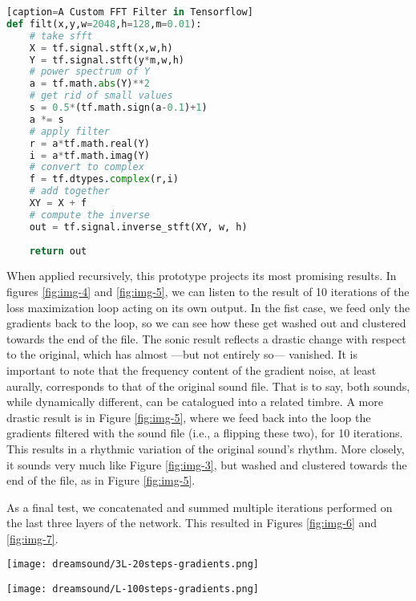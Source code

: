 \documentclass{nime-alternate}
\begin{document}
\begin{lstlisting}[language=Python][caption=A Custom FFT Filter in Tensorflow]
def filt(x,y,w=2048,h=128,m=0.01):
    # take sfft
    X = tf.signal.stft(x,w,h)
    Y = tf.signal.stft(y*m,w,h)
    # power spectrum of Y
    a = tf.math.abs(Y)**2
    # get rid of small values
    s = 0.5*(tf.math.sign(a-0.1)+1)
    a *= s 
    # apply filter
    r = a*tf.math.real(Y)
    i = a*tf.math.imag(Y)
    # convert to complex
    f = tf.dtypes.complex(r,i)
    # add together
    XY = X + f
    # compute the inverse
    out = tf.signal.inverse_stft(XY, w, h)
    
    return out
\end{lstlisting}
When applied recursively, this prototype projects its most promising results. In figures \ref{fig:img-4} and \ref{fig:img-5}, we can listen to the result of 10 iterations of the loss maximization loop acting on its own output. In the fist case, we feed only the gradients back to the loop, so we can see how these get washed out and clustered towards the end of the file. The sonic result reflects a drastic change with respect to the original, which has almost ---but not entirely so--- vanished. It is important to note that the frequency content of the gradient noise, at least aurally, corresponds to that of the original sound file. That is to say, both sounds, while dynamically different, can be catalogued into a related timbre. A more drastic result is in Figure \ref{fig:img-5}, where we feed back into the loop the gradients filtered with the sound file (i.e., a flipping these two), for 10 iterations. This results in a rhythmic variation of the original sound's rhythm. More closely, it sounds very much like Figure \ref{fig:img-3}, but washed and clustered towards the end of the file, as in Figure \ref{fig:img-5}. 

As a final test, we concatenated and summed multiple iterations performed on the last three layers of the network. This resulted in Figures  \ref{fig:img-6} and  \ref{fig:img-7}.

\begin{figure*}[htbp]
       \centering
              \texttt{[image: dreamsound/3L-20steps-gradients.png]}
       \caption{Taking last three layers, outputting gradients recursively for 20 steps.}
       \label{fig:img-6}
\end{figure*}
\begin{figure*}[htbp]
       \centering
              \texttt{[image: dreamsound/L-100steps-gradients.png]}
       \caption{Taking last 3 layers, for 100 steps, recursively feeding the gradients}
       \label{fig:img-7}
\end{figure*}
\end{document}
